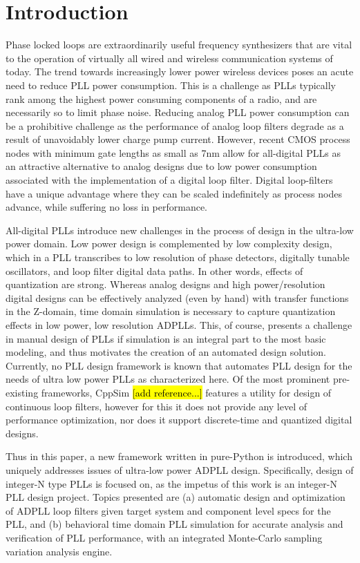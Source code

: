 \section{Introduction}\label{intro}
Phase locked loops are extraordinarily useful frequency synthesizers that are vital to the operation of virtually all wired and wireless communication systems of today. The trend towards increasingly lower power wireless devices poses an acute need to reduce PLL power consumption. This is a challenge as PLLs typically rank among the highest power consuming components of a radio, and are necessarily so to limit phase noise. Reducing analog PLL power consumption can be a prohibitive challenge as the performance of analog loop filters degrade as a result of unavoidably lower charge pump current. However, recent CMOS process nodes with minimum gate lengths as small as 7nm allow for all-digital PLLs as an attractive alternative to analog designs due to low power consumption associated with the implementation of a digital loop filter. Digital loop-filters have a unique advantage where they can be scaled indefinitely as process nodes advance, while suffering no loss in performance. 

All-digital PLLs introduce new challenges in the process of design in the ultra-low power domain. Low power design is complemented by low complexity design, which in a PLL transcribes to low resolution of phase detectors, digitally tunable oscillators, and loop filter digital data paths. In other words, effects of quantization are strong. Whereas analog designs and high power/resolution digital designs can be effectively analyzed (even by hand) with transfer functions in the Z-domain, time domain simulation is necessary to capture quantization effects in low power, low resolution ADPLLs. This, of course, presents a challenge in manual design of PLLs if simulation is an integral part to the most basic modeling, and thus motivates the creation of an automated design solution. Currently, no PLL design framework is known that automates PLL design for the needs of ultra low power PLLs as characterized here. Of the most prominent pre-existing frameworks, CppSim \hl{[add reference...]} features a utility for design of continuous loop filters, however for this it does not provide any level of performance optimization, nor does it support discrete-time and quantized digital designs. 

Thus in this paper, a new framework written in pure-Python is introduced, which uniquely addresses issues of ultra-low power ADPLL design. Specifically, design of integer-N type PLLs is focused on, as the impetus of this work is an integer-N PLL design project. Topics presented are (a) automatic design and optimization of ADPLL loop filters given target system and component level specs for the PLL, and (b) behavioral time domain PLL simulation for accurate analysis and verification of PLL performance, with an integrated Monte-Carlo sampling variation analysis engine.

